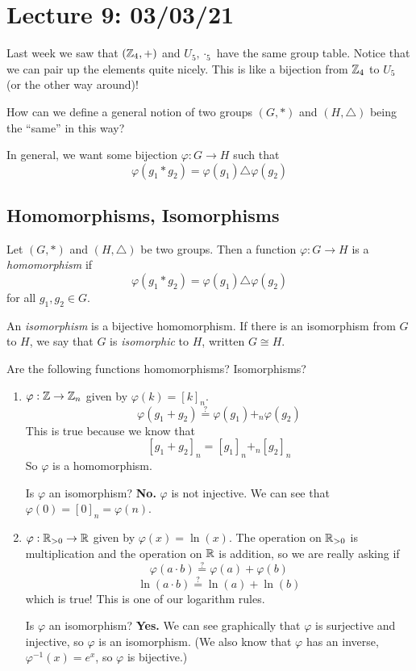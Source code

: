\section{Lecture 9: 03/03/21}

\begin{example}
Last week we saw that $(\mathbb{Z}_4,+)$ and $U_5,\cdot_5$ have the same group table. Notice that we can pair up the elements quite nicely. This is like a bijection from $\mathbb{Z}_4$ to $U_5$ (or the other way around)!
\end{example}

\begin{question}
How can we define a general notion of two groups $(G,*)$ and $(H,\triangle)$ being the ``same'' in this way?
\end{question}
In general, we want some bijection $\varphi: G \rightarrow H$ such that 
\[\varphi(g_1*g_2) = \varphi(g_1) \triangle \varphi(g_2)\]

\subsection{Homomorphisms, Isomorphisms}

\begin{definition}[Homomorphism]
Let $(G,*)$ and $(H,\triangle)$ be two groups. Then a function $\varphi:G\rightarrow H$ is a \textit{homomorphism} if 
\[\varphi(g_1*g_2) = \varphi(g_1)\triangle \varphi(g_2)\]
for all $g_1,g_2\in G$.
\end{definition}
\begin{definition}[Isomorphism]
An \textit{isomorphism} is a bijective homomorphism. If there is an isomorphism from $G$ to $H$, we say that $G$ is \textit{isomorphic} to $H$, written $G \cong H$.
\end{definition}

\begin{example}
Are the following functions homomorphisms? Isomorphisms?
\begin{enumerate}
    \item $\varphi:\mathbb{Z} \rightarrow \mathbb{Z}_n$ given by $\varphi(k)=[k]_n$.
    \[\varphi(g_1+g_2) \stackrel{?}{=} \varphi(g_1) +_n \varphi(g_2)\]
    This is true because we know that 
    \[[g_1+g_2]_n = [g_1]_n +_n [g_2]_n\]
    So $\varphi$ is a homomorphism.
    \medskip
    
    Is $\varphi$ an isomorphism? \textbf{No.} $\varphi$ is not injective. We can see that $\varphi(0)=[0]_n=\varphi(n)$.
    \item $\varphi:\mathbb{R}_{>0} \rightarrow \mathbb{R}$ given by $\varphi(x)=\ln(x)$.
    The operation on $\mathbb{R}_{>0}$ is multiplication and the operation on $\mathbb{R}$ is addition, so we are really asking if
    \[\varphi(a\cdot b) \stackrel{?}{=} \varphi(a)+\varphi(b)\]
    \[\ln(a\cdot b) \stackrel{?}{=} \ln(a)+\ln(b)\]
    which is true! This is one of our logarithm rules.
    \medskip
    
    Is $\varphi$ an isomorphism? \textbf{Yes.} We can see graphically that $\varphi$ is surjective and injective, so $\varphi$ is an isomorphism. (We also know that $\varphi$ has an inverse, $\varphi^{-1}(x)=e^x$, so $\varphi$ is bijective.)
\end{enumerate}
\end{example}

